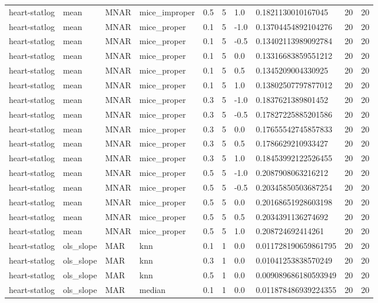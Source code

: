 \begin{tabular}{llllllllll}
heart-statlog & mean & MNAR & mice\_improper & 0.5 & 5 & 1.0 & 0.1821130010167045 & 20 & 20 \\
heart-statlog & mean & MNAR & mice\_proper & 0.1 & 5 & -1.0 & 0.13704454892104276 & 20 & 20 \\
heart-statlog & mean & MNAR & mice\_proper & 0.1 & 5 & -0.5 & 0.13402113989092784 & 20 & 20 \\
heart-statlog & mean & MNAR & mice\_proper & 0.1 & 5 & 0.0 & 0.13316683859551212 & 20 & 20 \\
heart-statlog & mean & MNAR & mice\_proper & 0.1 & 5 & 0.5 & 0.1345209004330925 & 20 & 20 \\
heart-statlog & mean & MNAR & mice\_proper & 0.1 & 5 & 1.0 & 0.13802507797877012 & 20 & 20 \\
heart-statlog & mean & MNAR & mice\_proper & 0.3 & 5 & -1.0 & 0.1837621389801452 & 20 & 20 \\
heart-statlog & mean & MNAR & mice\_proper & 0.3 & 5 & -0.5 & 0.17827225885201586 & 20 & 20 \\
heart-statlog & mean & MNAR & mice\_proper & 0.3 & 5 & 0.0 & 0.17655542745857833 & 20 & 20 \\
heart-statlog & mean & MNAR & mice\_proper & 0.3 & 5 & 0.5 & 0.1786629210933427 & 20 & 20 \\
heart-statlog & mean & MNAR & mice\_proper & 0.3 & 5 & 1.0 & 0.18453992122526455 & 20 & 20 \\
heart-statlog & mean & MNAR & mice\_proper & 0.5 & 5 & -1.0 & 0.2087908063216212 & 20 & 20 \\
heart-statlog & mean & MNAR & mice\_proper & 0.5 & 5 & -0.5 & 0.20345850503687254 & 20 & 20 \\
heart-statlog & mean & MNAR & mice\_proper & 0.5 & 5 & 0.0 & 0.20168651928603198 & 20 & 20 \\
heart-statlog & mean & MNAR & mice\_proper & 0.5 & 5 & 0.5 & 0.2034391136274692 & 20 & 20 \\
heart-statlog & mean & MNAR & mice\_proper & 0.5 & 5 & 1.0 & 0.208724692414261 & 20 & 20 \\
heart-statlog & ols\_slope & MAR & knn & 0.1 & 1 & 0.0 & 0.011728190659861795 & 20 & 20 \\
heart-statlog & ols\_slope & MAR & knn & 0.3 & 1 & 0.0 & 0.01041253838570249 & 20 & 20 \\
heart-statlog & ols\_slope & MAR & knn & 0.5 & 1 & 0.0 & 0.009089686180593949 & 20 & 20 \\
heart-statlog & ols\_slope & MAR & median & 0.1 & 1 & 0.0 & 0.011878486939224355 & 20 & 20 \\

\end{tabular}
